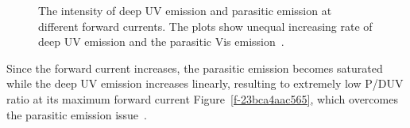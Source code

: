 \documentclass[11pt]{article}
\makeatletter
\def\fixFloatSize#1{}%
\makeatother
\begin{document}
\bgroup
\fixFloatSize{images/00f20b2f-0b5a-498f-99f8-0f7bd4ddeb7e-uintensityofdeepuvemissionandparasiticemission.png}
\begin{figure}[!htbp]
\centering \makeatletter{}
\makeatother 
\caption{{The intensity of deep UV emission and parasitic emission at different forward currents. The plots show unequal increasing rate of deep UV emission and the parasitic Vis emission\unskip~\protect\cite{693772:16459460}.}}
\label{f-6a19629c79ef}
\end{figure}
\egroup
Since the forward current increases, the parasitic emission becomes saturated while the deep UV emission increases linearly, resulting to extremely low P/DUV ratio at its maximum forward current Figure~\ref{f-23bca4aac565}, which overcomes the parasitic emission issue\unskip~\cite{693772:16459460}.
\end{document}
